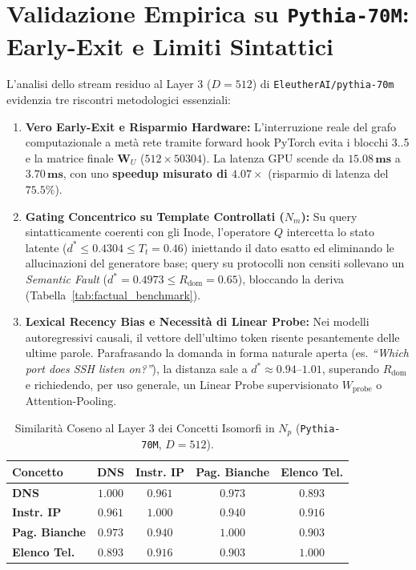 \documentclass[10pt,twocolumn]{article}
\theoremstyle{definition}
\begin{document}
\section{Validazione Empirica su \texttt{Pythia-70M}: Early-Exit e Limiti Sintattici}
L'analisi dello stream residuo al Layer 3 ($D=512$) di \texttt{EleutherAI/pythia-70m} evidenzia tre riscontri metodologici essenziali:
\begin{enumerate}[leftmargin=*, itemsep=1.5pt]
    \item \textbf{Vero Early-Exit e Risparmio Hardware:} L'interruzione reale del grafo computazionale a metà rete tramite forward hook PyTorch evita i blocchi 3..5 e la matrice finale $\mathbf{W}_U$ ($512 \times 50304$). La latenza GPU scende da $\mathbf{15.08\,\text{ms}}$ a $\mathbf{3.70\,\text{ms}}$, con uno \textbf{speedup misurato di $4.07\times$} (risparmio di latenza del $\mathbf{75.5\%}$).
    \item \textbf{Gating Concentrico su Template Controllati ($N_m$):} Su query sintatticamente coerenti con gli Inode, l'operatore $Q$ intercetta lo stato latente ($d^* \le 0.4304 \le T_t = 0.46$) iniettando il dato esatto ed eliminando le allucinazioni del generatore base; query su protocolli non censiti sollevano un \textit{Semantic Fault} ($d^* = 0.4973 \le R_{\mathrm{dom}} = 0.65$), bloccando la deriva (Tabella~\ref{tab:factual_benchmark}).
    \item \textbf{Lexical Recency Bias e Necessità di Linear Probe:} Nei modelli autoregressivi causali, il vettore dell'ultimo token risente pesantemente delle ultime parole. Parafrasando la domanda in forma naturale aperta (es. \textit{``Which port does SSH listen on?''}), la distanza sale a $d^* \approx 0.94\text{--}1.01$, superando $R_{\mathrm{dom}}$ e richiedendo, per uso generale, un Linear Probe supervisionato $W_{\mathrm{probe}}$ o Attention-Pooling.
\end{enumerate}

\begin{table}[t]
\centering
\caption{Similarità Coseno al Layer 3 dei Concetti Isomorfi in $N_p$ (\texttt{Pythia-70M}, $D=512$).}
\label{tab:pythia}
\vspace{0.1cm}
\scriptsize
\setlength{\tabcolsep}{2.0pt}
\begin{tabular}{@{}lcccc@{}}
\toprule
\textbf{Concetto} & \textbf{DNS} & \textbf{Instr. IP} & \textbf{Pag. Bianche} & \textbf{Elenco Tel.} \\ \midrule
\textbf{DNS} & $1.000$ & $0.961$ & $0.973$ & $0.893$ \\
\textbf{Instr. IP} & $0.961$ & $1.000$ & $0.940$ & $0.916$ \\
\textbf{Pag. Bianche} & $0.973$ & $0.940$ & $1.000$ & $0.903$ \\
\textbf{Elenco Tel.} & $0.893$ & $0.916$ & $0.903$ & $1.000$ \\ \bottomrule
\end{tabular}
\end{table}
\end{document}
